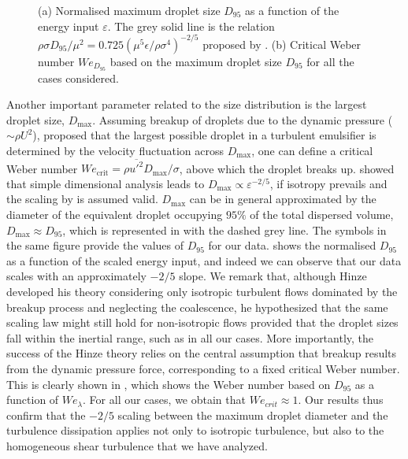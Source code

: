 \begin{figure}
	\centering
	 \hspace{0.5cm}
	 \vspace{0.5cm}
	\caption{(a) Normalised maximum droplet size $D_{95}$ as a function of the energy input $\varepsilon$. The grey solid line is the relation $\rho \sigma D_{95}/\mu^2 = 0.725 \left( \mu^5 \epsilon/\rho \sigma^4 \right)^{-2/5}$ proposed by \cite{hinze_1955a}. (b) Critical Weber number $We_{D_{95}}$ based on the maximum droplet size $D_{95}$ for all the cases considered.}
	\label{fig:hinze}
\end{figure}

Another important parameter related to the size distribution is the largest droplet size, $D_\textrm{max}$. Assuming breakup of droplets due to the dynamic pressure ($\sim \rho U^2$), \cite{hinze_1955a} proposed that the largest possible droplet in a turbulent emulsifier is determined by the velocity fluctuation across $D_\textrm{max}$, \ie one can define a critical Weber number $We_\textrm{crit}=\rho \overline{u'^2} D_\textrm{max}/\sigma$, above which the droplet breaks up. \citet{hinze_1955a} showed that simple dimensional analysis leads to $D_\textrm{max} \propto \varepsilon^{-2/5}$, if isotropy prevails and the scaling by \citet{kolmogorov_1941a} is assumed valid. $D_\textrm{max}$ can be in general approximated by the diameter of the equivalent droplet occupying $95\%$ of the total dispersed volume, \ie $D_\textrm{max} \approx D_{95}$, which is represented in  with the dashed grey line. The symbols in the same figure provide the values of $D_{95}$ for our data.  shows the normalised $D_{95}$ as a function of the scaled energy input, and indeed we can observe that our data scales with an approximately $-2/5$ slope. We remark that, although Hinze developed his theory considering only isotropic turbulent flows dominated by the breakup process and neglecting the coalescence, he hypothesized that the same scaling law might still hold for non-isotropic flows provided that the droplet sizes fall within the inertial range, such as in all our cases. More importantly, the success of the Hinze theory relies on the central assumption that breakup results from the dynamic pressure force, corresponding to a fixed critical Weber number. This is clearly shown in , which shows the Weber number based on $D_{95}$ as a function of $We_\lambda$. For all our cases, we obtain that $We_{crit} \approx 1$. Our results thus confirm that the $-2/5$ scaling between the maximum droplet diameter and the turbulence dissipation applies not only to isotropic turbulence, but also to the homogeneous shear turbulence that we have analyzed.

